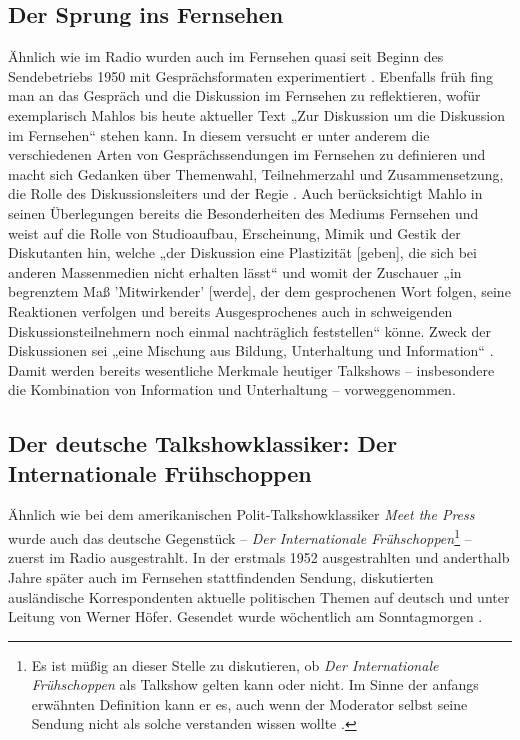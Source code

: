 \subsection{Der Sprung ins Fernsehen}

Ähnlich wie im Radio wurden auch im Fernsehen quasi seit Beginn des Sendebetriebs  1950 mit Gesprächsformaten experimentiert \parencite[87]{kellerGeschichteTalkshowDeutschland2009}. Ebenfalls früh fing man an das Gespräch und die Diskussion im Fernsehen zu reflektieren, wofür exemplarisch Mahlos bis heute aktueller Text „Zur Diskussion um die Diskussion im Fernsehen“ \parencite{mahloZurDiskussionUm1956} stehen kann. In diesem versucht er unter anderem die verschiedenen Arten von Gesprächssendungen im Fernsehen zu definieren \parencite[100f.]{mahloZurDiskussionUm1956} und macht sich Gedanken über Themenwahl, Teilnehmerzahl und Zusammensetzung, die Rolle des Diskussionsleiters und der Regie \parencite[104-107]{mahloZurDiskussionUm1956}. Auch berücksichtigt Mahlo in seinen Überlegungen bereits die Besonderheiten des Mediums Fernsehen und weist auf die Rolle von Studioaufbau, Erscheinung, Mimik und Gestik der Diskutanten hin, welche „der Diskussion eine Plastizität [geben], die sich bei anderen Massenmedien nicht erhalten lässt“ \parencite[102]{mahloZurDiskussionUm1956} und womit der Zuschauer „in begrenztem Maß 'Mitwirkender' [werde], der dem gesprochenen Wort folgen, seine Reaktionen verfolgen und bereits Ausgesprochenes auch in schweigenden Diskussionsteilnehmern noch einmal nachträglich feststellen“ \parencite[103]{mahloZurDiskussionUm1956} könne. Zweck der Diskussionen sei „eine Mischung aus Bildung, Unterhaltung und Information“ \parencite[103]{mahloZurDiskussionUm1956}. Damit werden bereits wesentliche Merkmale heutiger Talkshows – insbesondere die Kombination von Information und Unterhaltung – vorweggenommen.

\subsection{Der deutsche Talkshowklassiker: Der Internationale Frühschoppen}

Ähnlich wie bei dem amerikanischen Polit-Talkshowklassiker \textit{Meet the Press} wurde auch das deutsche Gegenstück – \textit{Der Internationale Frühschoppen}\footnote{Es ist müßig an dieser Stelle zu diskutieren, ob \textit{Der Internationale Frühschoppen} als Talkshow gelten kann oder nicht. Im Sinne der anfangs erwähnten Definition kann er es, auch wenn der Moderator selbst seine Sendung nicht als solche verstanden wissen wollte \parencite[112]{kellerGeschichteTalkshowDeutschland2009}.} – zuerst im Radio ausgestrahlt. In der erstmals 1952 ausgestrahlten und anderthalb Jahre später auch im Fernsehen stattfindenden Sendung, diskutierten ausländische Korrespondenten aktuelle politischen Themen auf deutsch und unter Leitung von Werner Höfer. Gesendet wurde wöchentlich am Sonntagmorgen \parencite[113f.]{kellerGeschichteTalkshowDeutschland2009}.

